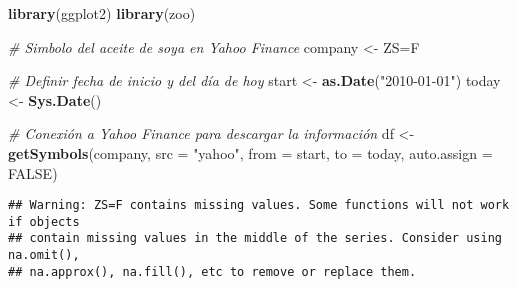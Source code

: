 \documentclass[
]{book}
\newenvironment{Shaded}{\begin{snugshade}}{\end{snugshade}}
\newcommand{\AttributeTok}[1]{\textcolor[rgb]{0.13,0.29,0.53}{#1}}
\newcommand{\CommentTok}[1]{\textcolor[rgb]{0.56,0.35,0.01}{\textit{#1}}}
\newcommand{\ConstantTok}[1]{\textcolor[rgb]{0.56,0.35,0.01}{#1}}
\newcommand{\FunctionTok}[1]{\textcolor[rgb]{0.13,0.29,0.53}{\textbf{#1}}}
\newcommand{\NormalTok}[1]{#1}
\newcommand{\OtherTok}[1]{\textcolor[rgb]{0.56,0.35,0.01}{#1}}
\newcommand{\StringTok}[1]{\textcolor[rgb]{0.31,0.60,0.02}{#1}}
\begin{document}
\begin{Shaded}
\begin{Highlighting}[]
\FunctionTok{library}\NormalTok{(ggplot2)}
\FunctionTok{library}\NormalTok{(zoo)}

\CommentTok{\# Simbolo del aceite de soya en Yahoo Finance}
\NormalTok{company }\OtherTok{\textless{}{-}} \StringTok{\textquotesingle{}ZS=F\textquotesingle{}}

\CommentTok{\# Definir fecha de inicio y del día de hoy}
\NormalTok{start }\OtherTok{\textless{}{-}} \FunctionTok{as.Date}\NormalTok{(}\StringTok{"2010{-}01{-}01"}\NormalTok{)}
\NormalTok{today }\OtherTok{\textless{}{-}} \FunctionTok{Sys.Date}\NormalTok{()}

\CommentTok{\# Conexión a Yahoo Finance para descargar la información}
\NormalTok{df }\OtherTok{\textless{}{-}} \FunctionTok{getSymbols}\NormalTok{(company, }\AttributeTok{src =} \StringTok{"yahoo"}\NormalTok{, }\AttributeTok{from =}\NormalTok{ start, }\AttributeTok{to =}\NormalTok{ today, }\AttributeTok{auto.assign =} \ConstantTok{FALSE}\NormalTok{)}
\end{Highlighting}
\end{Shaded}

\begin{verbatim}
## Warning: ZS=F contains missing values. Some functions will not work if objects
## contain missing values in the middle of the series. Consider using na.omit(),
## na.approx(), na.fill(), etc to remove or replace them.
\end{verbatim}
\end{document}
